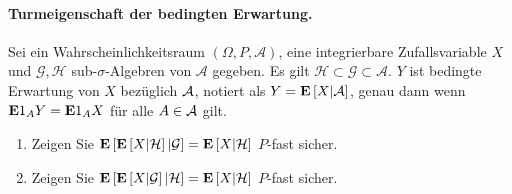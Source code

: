 \paragraph{Turmeigenschaft der bedingten Erwartung.} Sei ein
Wahrscheinlichkeitsraum $\left( \Omega, P, \mathcal A \right)$, eine
integrierbare Zufallsvariable $X$ und $\mathcal G, \mathcal H$
sub-$\sigma$-Algebren von $\mathcal A$ gegeben. Es gilt $\mathcal H \subset
\mathcal G \subset \mathcal A$. $Y$ ist bedingte Erwartung von $X$ bezüglich $\mathcal A$, notiert
als $Y = \mathbf{E} \left[ X | \mathcal A \right]$, genau dann wenn $\mathbf{E} 1_A Y = \mathbf{E} 1_A X$ für alle $A\in\mathcal A$ gilt.
\begin{enumerate}
    \item Zeigen Sie $\mathbf{E} \left[  \mathbf{E} \left[ X | \mathcal H \right] | \mathcal G \right] = \mathbf{E} \left[ X | \mathcal H \right]$ $P$-fast sicher.
    \item Zeigen Sie $\mathbf{E} \left[  \mathbf{E} \left[ X | \mathcal G \right] | \mathcal H \right] = \mathbf{E} \left[ X | \mathcal H \right]$ $P$-fast sicher.
\end{enumerate}


